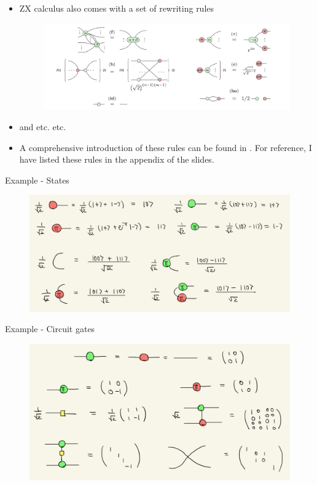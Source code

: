 \documentclass[aspectratio=169,xcolor=dvipsnames, t]{beamer}
\begin{document}
\begin{frame}
    \begin{itemize}
        \item ZX calculus also comes with a set of rewriting rules 
        \begin{figure}
            \centering 
            \includegraphics[width=\textwidth]{figures/zx_rewrite_rules_p1.png}
        \end{figure}
        \item and etc. etc.
        \item A comprehensive introduction of these rules can be found in \cite{zx_for_working_qcs}. For reference, I have listed these rules in the appendix of the slides.
    \end{itemize}
\end{frame}

\begin{frame}{Example - States}
\begin{figure}
    \centering
    \includegraphics[width=1.\textwidth]{figures/zx_states.PNG}
\end{figure}
\end{frame}

\begin{frame}{Example - Circuit gates}
    \begin{figure}
        \centering
        \includegraphics[width=.85\textwidth]{figures/zx_common_gates.PNG}
    \end{figure}
\end{frame}
\end{document}
